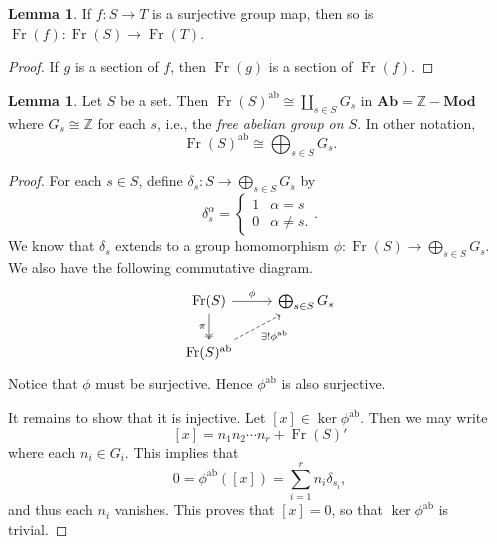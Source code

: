\documentclass[10pt,letterpaper,cm]{nupset}
\theoremstyle{definition}
\theoremstyle{theorem}
\newtheorem{lemma}[definition]{Lemma}
\theoremstyle{remark}
\newcommand{\Z}{\mathbb Z}
\newcommand{\1}{\mathbf{1}}
\newcommand{\0}{\vec 0}
\DeclareMathOperator{\ab}{ab}
\DeclareMathOperator{\Fr}{Fr}
\begin{document}
\begin{lemma}
If $f: S \to T$ is a surjective group map, then so is $\Fr(f) : \Fr(S) \to \Fr(T)$.
\end{lemma}
\begin{proof}
If $g$ is a section of $f$, then $\Fr(g)$ is a section of $\Fr(f)$.
\end{proof}

\begin{lemma}
Let $S$ be a set. Then $\Fr(S)^{\ab}\cong \coprod_{s\in S} G_s$ in $\mathbf{Ab} = \Z{-}\mathbf{Mod}$ where $G_s\cong \Z$ for each $s$, i.e., the \textit{free abelian group on $S$}. In other notation, $$\Fr(S)^{\ab} \cong \bigoplus_{s\in S} G_s.$$
\end{lemma}
\begin{proof}
For each $s\in S$, define $\delta_s : S \to \bigoplus_{s\in S} G_s$ by $$\delta_s^{\alpha} =  \begin{cases} 1 & \alpha = s \\ 0 & \alpha \ne s . \end{cases}.$$ We know that $\delta_s$ extends to a group  homomorphism $ \phi : \Fr(S) \to \bigoplus_{s\in S} G_s$. We also have the following commutative diagram.
\[
\begin{tikzcd}
\Fr(S) \arrow[d, "\pi"', two heads] \arrow[r, "\phi"] & \bigoplus_{s\in S} G_s \\
\Fr(S)^{\ab} \arrow[ru, "\exists! \phi^{\ab}"', dashed] & 
\end{tikzcd}
\]
Notice that $\phi$ must be surjective. Hence $\phi^{\ab}$ is also surjective.

It remains to show that it is injective. Let $[x] \in \ker{\phi}^{\ab}$.
Then we may write $$[x] = n_1n_2\cdots n_r+\Fr(S)'$$ where each $n_i \in G_i$. This implies that $$0= \phi^{\ab}([x]) = \sum_{i=1}^r n_i \delta_{s_i},$$ and thus each $n_i$ vanishes. This proves that $[x]=0$, so that $\ker{\phi^{\ab}}$ is trivial. 
\end{proof}
\end{document}
